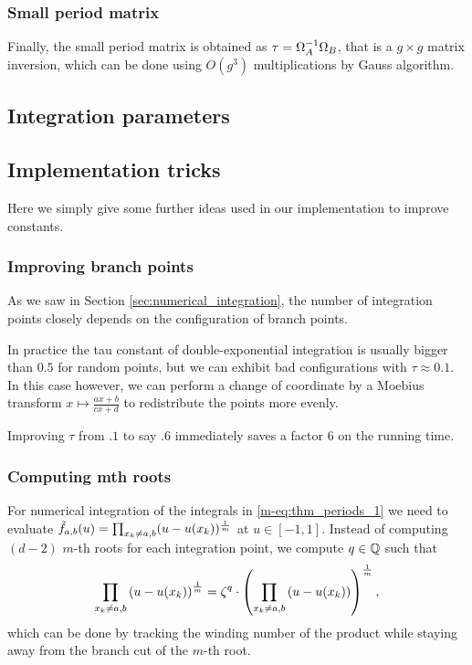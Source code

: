 \documentclass[main.tex]{subfiles}
\begin{document}
   \subsubsection{Small period matrix}

   Finally, the small period matrix is obtained as $\tau=\Omega_A^{-1}\Omega_B$,
   that is a $g\times g$ matrix inversion, which can be done using
   $O(g^3)$ multiplications by Gauss algorithm.

   \subsection{Integration parameters}

   \subsection{Implementation tricks}

   Here we simply give some further ideas used in our implementation to improve constants.

   \subsubsection{Improving branch points}

   As we saw in Section \ref{sec:numerical_integration}, the number of integration points
   closely depends on the configuration of branch points.

   In practice the tau constant of double-exponential integration is usually bigger than $0.5$
   for random points, but we can exhibit bad configurations with $τ\approx 0.1$. In this case
   however, we can perform a change of coordinate by a Moebius transform
   $x\mapsto \frac{ax+b}{cx+d}$ to redistribute the points more evenly.

   Improving $τ$ from $.1$ to say $.6$ immediately saves a factor $6$ on the running time.

  \subsubsection{Computing mth roots}

  For numerical integration of the integrals in \eqref{m-eq:thm_periods_1}
  we need to evaluate $\tilde{f}_{a,b}(u) = \prod_{x_k \ne a,b} (u-u(x_k))^{\frac{1}{m}}$ at $u
  \in [-1,1]$. Instead of computing $(d-2)$ $m$-th roots for each
  integration point, we compute $q \in \mathbb{Q}$ such that $$\prod_{x_k \ne a,b}
  \left(u - u(x_k) \right)^{\frac{1}{m}} = \zeta^q \cdot \left( \prod_{x_k \ne a,b}
  \left( u - u(x_k) \right) \right)^{\frac{1}{m}} ,$$ which can be done by tracking
  the winding number of the product while staying away from the branch cut
  of the $m$-th root.
\end{document}
